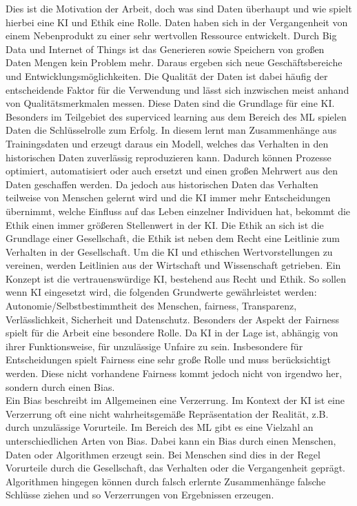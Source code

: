 \begin{onehalfspace}
Dies ist die Motivation der Arbeit, doch was sind Daten überhaupt und wie spielt hierbei eine KI und Ethik eine Rolle. Daten haben sich in der Vergangenheit von einem Nebenprodukt zu einer sehr wertvollen Ressource entwickelt. Durch Big Data und Internet of Things ist das Generieren sowie Speichern von großen Daten Mengen kein Problem mehr. Daraus ergeben sich neue Geschäftsbereiche und Entwicklungsmöglichkeiten. Die Qualität der Daten ist dabei häufig der entscheidende Faktor für die Verwendung und lässt sich inzwischen meist anhand von Qualitätsmerkmalen messen. Diese Daten sind die Grundlage für eine KI. Besonders im Teilgebiet des superviced learning aus dem Bereich des ML spielen Daten die Schlüsselrolle zum Erfolg. In diesem lernt man Zusammenhänge aus Trainingsdaten und erzeugt daraus ein Modell, welches das Verhalten in den historischen Daten zuverlässig reproduzieren kann. Dadurch können Prozesse optimiert, automatisiert oder auch ersetzt und einen großen Mehrwert aus den Daten geschaffen werden. Da jedoch aus historischen Daten das Verhalten teilweise von Menschen gelernt wird und die KI immer mehr Entscheidungen übernimmt, welche Einfluss auf das Leben einzelner Individuen hat, bekommt die Ethik einen immer größeren Stellenwert in der KI. Die Ethik an sich ist die Grundlage einer Gesellschaft, die Ethik ist neben dem Recht eine Leitlinie zum Verhalten in der Gesellschaft. Um die KI und ethischen Wertvorstellungen zu vereinen, werden Leitlinien aus der Wirtschaft und Wissenschaft getrieben. Ein Konzept ist die vertrauenswürdige KI, bestehend aus Recht und Ethik. So sollen wenn KI eingesetzt wird, die folgenden Grundwerte gewährleistet werden: Autonomie/Selbstbestimmtheit des Menschen, fairness, Transparenz, Verlässlichkeit, Sicherheit und Datenschutz. Besonders der Aspekt der Fairness spielt für die Arbeit eine besondere Rolle. Da KI in der Lage ist, abhängig von ihrer Funktionsweise, für unzulässige Unfaire zu sein. Insbesondere für Entscheidungen spielt Fairness eine sehr große Rolle und muss berücksichtigt werden. Diese nicht vorhandene Fairness kommt jedoch nicht von irgendwo her, sondern durch einen Bias.\\
Ein Bias beschreibt im Allgemeinen eine Verzerrung. Im Kontext der KI ist eine Verzerrung oft eine nicht wahrheitsgemäße Repräsentation der Realität, z.B. durch unzulässige Vorurteile. Im Bereich des ML gibt es eine Vielzahl an unterschiedlichen Arten von Bias. Dabei kann ein Bias durch einen Menschen, Daten oder Algorithmen erzeugt sein. Bei Menschen sind dies in der Regel Vorurteile durch die Gesellschaft, das Verhalten oder die Vergangenheit geprägt. Algorithmen hingegen können durch falsch erlernte Zusammenhänge falsche Schlüsse ziehen und so Verzerrungen von Ergebnissen erzeugen.\\

\end{onehalfspace}
